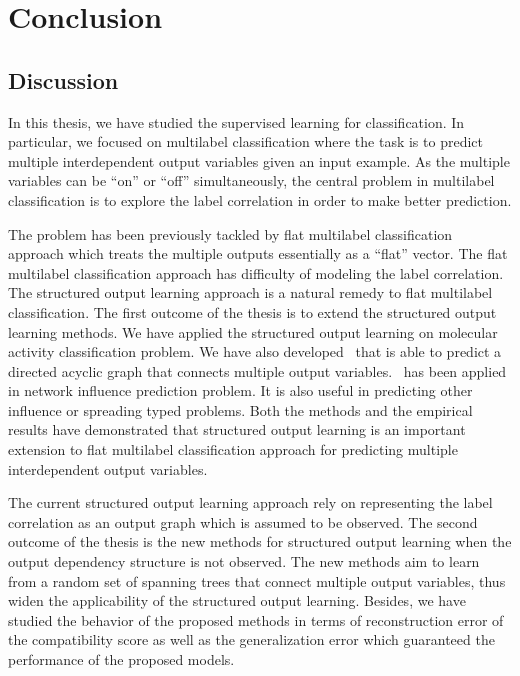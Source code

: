 {%
%
%
\chapter{Conclusion} \label{ch_conclusion}


\section{Discussion}

In this thesis, we have studied the supervised learning for classification.
In particular, we focused on multilabel classification where the task is to predict multiple interdependent output variables given an input example.
As the multiple variables can be ``on'' or ``off'' simultaneously, the central problem in multilabel classification is to explore the label correlation in order to make better prediction.

The problem has been previously tackled by flat multilabel classification approach which treats the multiple outputs essentially as a ``flat'' vector.
The flat multilabel classification approach has difficulty of modeling the label correlation.
The structured output learning approach is a natural remedy to flat multilabel classification.
The first outcome of the thesis is to extend the structured output learning methods.
We have applied the structured output learning on molecular activity classification problem.
We have also developed \spin\ that is able to predict a directed acyclic graph that connects multiple output variables.
\spin\ has been applied in network influence prediction problem.
It is also useful in predicting other influence or spreading typed problems.
Both the methods and the empirical results have demonstrated that structured output learning is an important extension to flat multilabel classification approach for predicting multiple interdependent output variables.

The current structured output learning approach rely on representing the label correlation as an output graph which is assumed to be observed.
The second outcome of the thesis is the new methods for structured output learning when the output dependency structure is not observed.
The new methods aim to learn from a random set of spanning trees that connect multiple output variables, thus widen the applicability of the structured output learning.
Besides, we have studied the behavior of the proposed methods in terms of reconstruction error of the compatibility score as well as the generalization error which guaranteed the performance of the proposed models.

}
